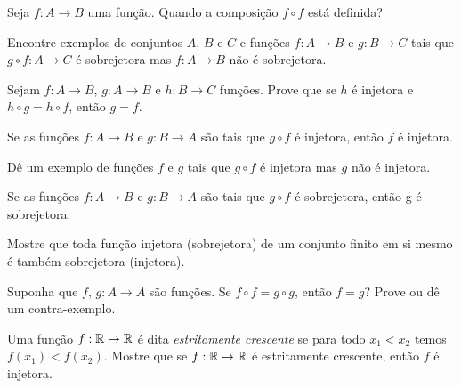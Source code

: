 \documentclass[12pt]{exam}
\begin{document}
\vspace{.3cm}

\questao{} Seja $f : A \to B$ uma função. Quando a composição $f \circ f$ está definida?

\vspace{.3cm}

\questao{} Encontre exemplos de conjuntos $A$, $B$ e $C$ e funções $f : A \to B$ e $g : B \to C$ tais que $g \circ f : A \to C$ é sobrejetora mas $f : A \to B$ não é sobrejetora.

\vspace{.3cm}

\questao{} Sejam $f : A \to B$, $g : A \to B$ e $h : B \to C$ funções. Prove que se $h$ é injetora e $h \circ g = h \circ f$, então $g = f$.

\vspace{.3cm}

\questao{} Se as funç{õ}es $f : A \to B$ e $g : B\to A$ são
tais que $g\circ f$ é injetora, então $f$ é injetora.

\vspace{.3cm}

\questao{} Dê um exemplo de funções $f$ e $g$ tais que $g \circ f$ é injetora mas $g$ não é injetora.

\vspace{.3cm}

\questao{} Se as funç{õ}es $f : A \to B$ e $g : B\to A$ são
tais que $g\circ f$ é sobrejetora, então g é sobrejetora.

\vspace{.3cm}

\questao{} Mostre que toda função injetora (sobrejetora) de um conjunto finito em si mesmo é também sobrejetora (injetora).

\vspace{.3cm}

\questao{} Suponha que $f$, $g : A \to A$ são funções. Se $f \circ f = g \circ g$, então $f = g$? Prove ou dê um contra-exemplo.

\vspace{.3cm}

\questao{} Uma função $f : \mathbb{R} \to \mathbb{R}$ é dita \textit{estritamente crescente} se para todo $x_1 < x_2$ temos $f(x_1) < f(x_2)$. Mostre que se $f : \mathbb{R} \to \mathbb{R}$ é estritamente crescente, então $f$ é injetora.

\vspace{.3cm}
\end{document}

